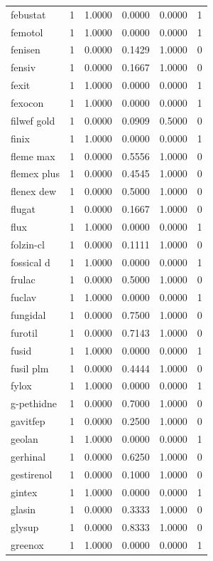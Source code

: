 \begin{longtable}{p{3.0cm}rrrrr}
febustat & 1 & 1.0000 & 0.0000 & 0.0000 & 1 \\
femotol & 1 & 1.0000 & 0.0000 & 0.0000 & 1 \\
fenisen & 1 & 0.0000 & 0.1429 & 1.0000 & 0 \\
fensiv & 1 & 0.0000 & 0.1667 & 1.0000 & 0 \\
fexit & 1 & 1.0000 & 0.0000 & 0.0000 & 1 \\
fexocon & 1 & 1.0000 & 0.0000 & 0.0000 & 1 \\
filwef gold & 1 & 0.0000 & 0.0909 & 0.5000 & 0 \\
finix & 1 & 1.0000 & 0.0000 & 0.0000 & 1 \\
fleme max & 1 & 0.0000 & 0.5556 & 1.0000 & 0 \\
flemex plus & 1 & 0.0000 & 0.4545 & 1.0000 & 0 \\
flenex dew & 1 & 0.0000 & 0.5000 & 1.0000 & 0 \\
flugat & 1 & 0.0000 & 0.1667 & 1.0000 & 0 \\
flux & 1 & 1.0000 & 0.0000 & 0.0000 & 1 \\
folzin-cl & 1 & 0.0000 & 0.1111 & 1.0000 & 0 \\
fossical d & 1 & 1.0000 & 0.0000 & 0.0000 & 1 \\
frulac & 1 & 0.0000 & 0.5000 & 1.0000 & 0 \\
fuclav & 1 & 1.0000 & 0.0000 & 0.0000 & 1 \\
fungidal & 1 & 0.0000 & 0.7500 & 1.0000 & 0 \\
furotil & 1 & 0.0000 & 0.7143 & 1.0000 & 0 \\
fusid & 1 & 1.0000 & 0.0000 & 0.0000 & 1 \\
fusil plm & 1 & 0.0000 & 0.4444 & 1.0000 & 0 \\
fylox & 1 & 1.0000 & 0.0000 & 0.0000 & 1 \\
g-pethidne & 1 & 0.0000 & 0.7000 & 1.0000 & 0 \\
gavitfep & 1 & 0.0000 & 0.2500 & 1.0000 & 0 \\
geolan & 1 & 1.0000 & 0.0000 & 0.0000 & 1 \\
gerhinal & 1 & 0.0000 & 0.6250 & 1.0000 & 0 \\
gestirenol & 1 & 0.0000 & 0.1000 & 1.0000 & 0 \\
gintex & 1 & 1.0000 & 0.0000 & 0.0000 & 1 \\
glasin & 1 & 0.0000 & 0.3333 & 1.0000 & 0 \\
glysup & 1 & 0.0000 & 0.8333 & 1.0000 & 0 \\
greenox & 1 & 1.0000 & 0.0000 & 0.0000 & 1 \\

\end{longtable}
